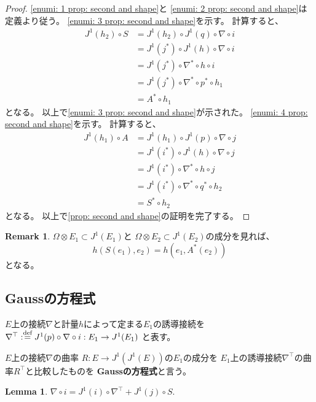 \documentclass[uplatex]{jsarticle}
\theoremstyle{definition}
\newtheorem{lem}[lem]{Lemma}
\newtheorem{rem}[rem]{Remark}
\newcommand{\dfn}{:\overset{\mbox{{\scriptsize def}}}{=}}
\begin{document}
\begin{proof}
  \ref{enumi: 1 prop: second and shape}と
  \ref{enumi: 2 prop: second and shape}は定義より従う。
  \ref{enumi: 3 prop: second and shape}を示す。
  計算すると、
  \begin{align*}
    J^1(h_2) \circ S &= J^1(h_2) \circ J^1(q) \circ \nabla \circ i \\
    &= J^1(j^*) \circ J^1(h) \circ \nabla \circ i \\
    &= J^1(j^*) \circ \nabla^* \circ h \circ i \\
    &= J^1(j^*) \circ \nabla^* \circ p^* \circ h_1 \\
    &= A^* \circ h_1
  \end{align*}
  となる。
  以上で\ref{enumi: 3 prop: second and shape}が示された。
  \ref{enumi: 4 prop: second and shape}を示す。
  計算すると、
  \begin{align*}
    J^1(h_1) \circ A &= J^1(h_1) \circ J^1(p) \circ \nabla \circ j \\
    &= J^1(i^*) \circ J^1(h) \circ \nabla \circ j \\
    &= J^1(i^*) \circ \nabla^* \circ h \circ j \\
    &= J^1(i^*) \circ \nabla^* \circ q^* \circ h_2 \\
    &= S^* \circ h_2
  \end{align*}
  となる。
  以上で\ref{prop: second and shape}の証明を完了する。
\end{proof}


\begin{rem}
  \(\Omega\otimes E_1\subset J^1(E_1)\)と
  \(\Omega\otimes E_2\subset J^1(E_2)\)の成分を見れば、
  \[
  h(S(e_1),e_2) = h(e_1,A^*(e_2))
  \]
  となる。
\end{rem}



\subsection{Gaussの方程式}

\(E\)上の接続\(\nabla\)と計量\(h\)によって定まる\(E_1\)の誘導接続を
\(\nabla^{\top}\dfn J^1(p)\circ \nabla \circ i :E_1 \to J^1(E_1)\)
と表す。

\(E\)上の接続\(\nabla\)の曲率
\(R:E\to J^1(J^1(E))\)の\(E_1\)の成分を
\(E_1\)上の誘導接続\(\nabla^{\top}\)の曲率\(R^{\top}\)と比較したものを
\textbf{Gaussの方程式}と言う。


\begin{lem}\label{lem: nabla E_1}
  \(\nabla\circ i = J^1(i) \circ \nabla^{\top} + J^1(j) \circ S\).
\end{lem}
\end{document}
